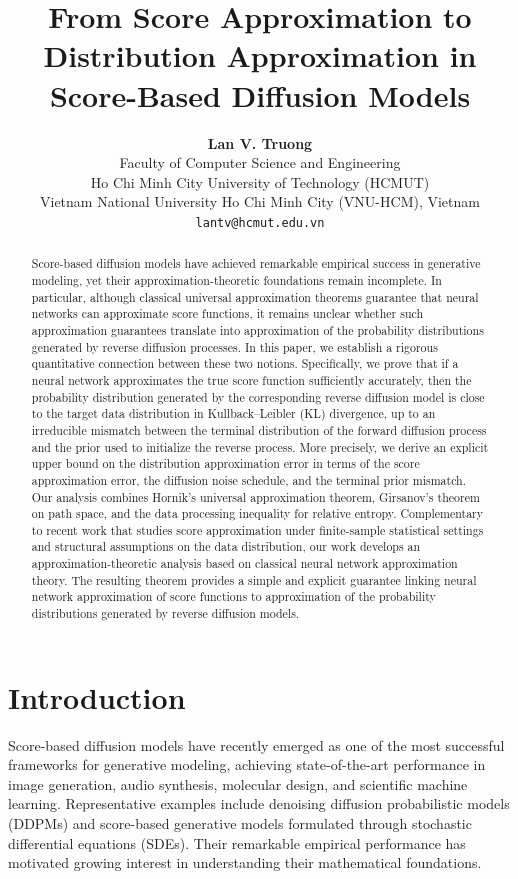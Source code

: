 \documentclass[11pt]{article}
\title{\textbf{From Score Approximation to Distribution Approximation in Score-Based Diffusion Models}}
\author{\textbf{Lan V. Truong}\\
Faculty of Computer Science and Engineering\\
Ho Chi Minh City University of Technology (HCMUT)\\
Vietnam National University Ho Chi Minh City (VNU-HCM), Vietnam\\
\texttt{lantv@hcmut.edu.vn}}
\date{}
\begin{document}
\maketitle

\begin{abstract}
Score-based diffusion models have achieved remarkable empirical success in generative modeling, yet their approximation-theoretic foundations remain incomplete. In particular, although classical universal approximation theorems guarantee that neural networks can approximate score functions, it remains unclear whether such approximation guarantees translate into approximation of the probability distributions generated by reverse diffusion processes. In this paper, we establish a rigorous quantitative connection between these two notions. Specifically, we prove that if a neural network approximates the true score function sufficiently accurately, then the probability distribution generated by the corresponding reverse diffusion model is close to the target data distribution in Kullback–Leibler (KL) divergence, up to an irreducible mismatch between the terminal distribution of the forward diffusion process and the prior used to initialize the reverse process. More precisely, we derive an explicit upper bound on the distribution approximation error in terms of the score approximation error, the diffusion noise schedule, and the terminal prior mismatch. Our analysis combines Hornik’s universal approximation theorem, Girsanov’s theorem on path space, and the data processing inequality for relative entropy. Complementary to recent work that studies score approximation under finite-sample statistical settings and structural assumptions on the data distribution, our work develops an approximation-theoretic analysis based on classical neural network approximation theory. The resulting theorem provides a simple and explicit guarantee linking neural network approximation of score functions to approximation of the probability distributions generated by reverse diffusion models.
\end{abstract}

\tableofcontents

\newpage


\section{Introduction}

Score-based diffusion models have recently emerged as one of the most successful
frameworks for generative modeling, achieving state-of-the-art performance in
image generation, audio synthesis, molecular design, and scientific machine
learning. Representative examples include denoising diffusion probabilistic
models (DDPMs) and score-based generative models formulated through stochastic
differential equations (SDEs). Their remarkable empirical performance has
motivated growing interest in understanding their mathematical foundations.
\end{document}
